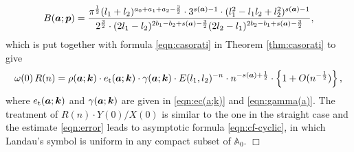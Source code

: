 \documentclass[a4paper,12pt]{article}
\theoremstyle{plain}
\def\rt{\mathrm{t}}
\def\A{\mathbb{A}}
\def\ba{\mbox{\boldmath $a$}}
\def\sba{\mbox{\boldmath ${\scriptstyle a}$}}
\def\bk{\mbox{\boldmath $k$}}
\def\bp{\mbox{\boldmath $p$}}
\begin{document}
\[
B(\ba; \bp) = 
\dfrac{\pi^{ \frac{1}{2} } (l_1+l_2)^{a_0+a_1+a_2- \frac{3}{2} } \cdot 3^{s(\sba)-1} 
\cdot (l_1^2-l_1l_2+l_2^2)^{s(\sba)-1}}{2^{ \frac{3}{2} } \cdot 
(2l_1-l_2)^{2 b_1-b_2+s(\sba)- \frac{3}{2} } 
(2l_2-l_1)^{2 b_2-b_1+s(\sba)-\frac{3}{2} }},  
\]
which is put together with formula \eqref{eqn:casorati} in Theorem \ref{thm:casorati} 
to give   
\[
\omega(0) \, R(n) = \rho(\ba; \bk) \cdot e_{\rt}(\ba; \bk) \cdot \gamma(\ba; \bk) 
\cdot E(l_1, l_2)^{-n} \cdot n^{-s(\sba) + \frac{1}{2} } \cdot 
\left\{1 + O(n^{-\frac{1}{2} }) \right\}, 
\]
where $e_{\rt}(\ba; \bk)$ and $\gamma(\ba; \bk)$ are given in 
\eqref{eqn:ec(a;k)} and \eqref{eqn:gamma(a)}.  
The treatment of $R(n) \cdot Y(0)/X(0)$ is similar to the one in the straight case 
and the estimate \eqref{eqn:error} leads to  asymptotic formula 
\eqref{eqn:cf-cyclic}, in which Landau's symbol is uniform in any compact 
subset of $\A_0$. \hfill $\Box$ 
\end{document}
